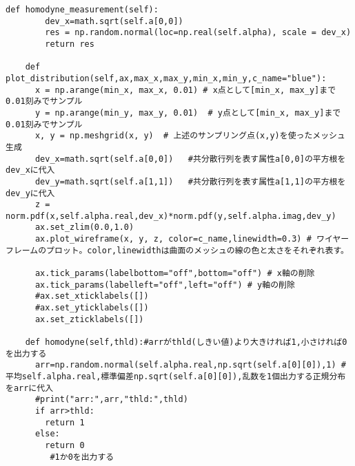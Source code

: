 \begin{lstlisting}[caption=量子状態のクラス,label=Qstate]
    def homodyne_measurement(self):
        dev_x=math.sqrt(self.a[0,0])
        res = np.random.normal(loc=np.real(self.alpha), scale = dev_x)
        return res

    def plot_distribution(self,ax,max_x,max_y,min_x,min_y,c_name="blue"):  
      x = np.arange(min_x, max_x, 0.01) # x点として[min_x, max_y]まで0.01刻みでサンプル
      y = np.arange(min_y, max_y, 0.01)  # y点として[min_x, max_y]まで0.01刻みでサンプル
      x, y = np.meshgrid(x, y)  # 上述のサンプリング点(x,y)を使ったメッシュ生成
      dev_x=math.sqrt(self.a[0,0])   #共分散行列を表す属性a[0,0]の平方根をdev_xに代入
      dev_y=math.sqrt(self.a[1,1])   #共分散行列を表す属性a[1,1]の平方根をdev_yに代入
      z = norm.pdf(x,self.alpha.real,dev_x)*norm.pdf(y,self.alpha.imag,dev_y)
      ax.set_zlim(0.0,1.0)
      ax.plot_wireframe(x, y, z, color=c_name,linewidth=0.3) # ワイヤーフレームのプロット。color,linewidthは曲面のメッシュの線の色と太さをそれぞれ表す。

      ax.tick_params(labelbottom="off",bottom="off") # x軸の削除
      ax.tick_params(labelleft="off",left="off") # y軸の削除
      #ax.set_xticklabels([]) 
      #ax.set_yticklabels([])
      ax.set_zticklabels([])

    def homodyne(self,thld):#arrがthld(しきい値)より大きければ1,小さければ0を出力する
      arr=np.random.normal(self.alpha.real,np.sqrt(self.a[0][0]),1) #平均self.alpha.real,標準偏差np.sqrt(self.a[0][0]),乱数を1個出力する正規分布をarrに代入
      #print("arr:",arr,"thld:",thld)
      if arr>thld:
        return 1
      else:
        return 0
         #1か0を出力する
\end{lstlisting}


